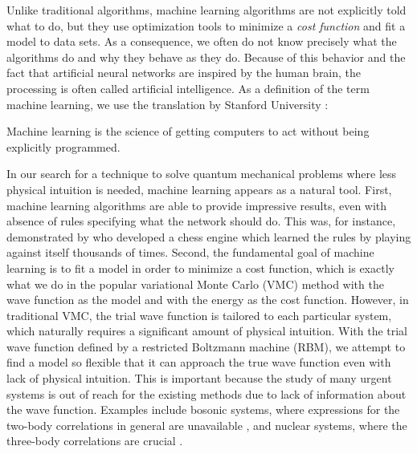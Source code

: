 Unlike traditional algorithms, machine learning algorithms are not explicitly told what to do, but they use optimization tools to minimize a \textit{cost function} and fit a model to data sets. As a consequence, we often do not know precisely what the algorithms do and why they behave as they do. Because of this behavior and the fact that artificial neural networks are inspired by the human brain, the processing is often called artificial intelligence. As a definition of the term machine learning, we use the translation by Stanford University \supercite{noauthor_machine_nodate}:

\begin{shadequote}{}
	Machine learning is the science of getting computers to act without being explicitly programmed.
\end{shadequote}

In our search for a technique to solve quantum mechanical problems where less physical intuition is needed, machine learning appears as a natural tool. First, machine learning algorithms are able to provide impressive results, even with absence of rules specifying what the network should do. This was, for instance, demonstrated by \citet{silver2017mastering} who developed a chess engine which learned the rules by playing against itself thousands of times. Second, the fundamental goal of machine learning is to fit a model in order to minimize a cost function, which is exactly what we do in the popular variational Monte Carlo (VMC) method with the wave function as the model and with the energy as the cost function. However, in traditional VMC, the trial wave function is tailored to each particular system, which naturally requires a significant amount of physical intuition. With the trial wave function defined by a restricted Boltzmann machine (RBM), we attempt to find a model so flexible that it can approach the true wave function even with lack of physical intuition. This is important because the study of many urgent systems is out of reach for the existing methods due to lack of information about the wave function. Examples include bosonic systems, where expressions for the two-body correlations in general are unavailable \supercite{holzmann_pair_1999}, and nuclear systems, where the three-body correlations are crucial \supercite{sauer_three-nucleon_2014}.


